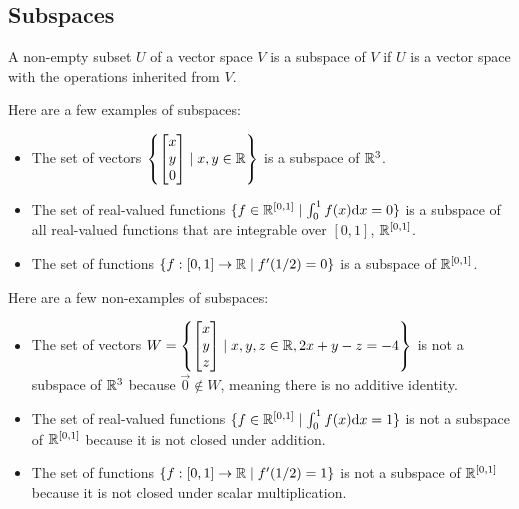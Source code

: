 \subsection{Subspaces}
\begin{definition}
	A non-empty subset $U$ of a vector space $V$ is a subspace of $V$ if $U$ is a vector space with the operations inherited from $V$.
\end{definition}

\begin{example}
	Here are a few examples of subspaces:
	\begin{itemize}
		\item 
			The set of vectors $\left\{\begin{bmatrix}x \\ y \\ 0\end{bmatrix} \mid x,y \in \mathbb{R}\right\}$ is a subspace of $\mathbb{R}^3$.
		\item
			The set of real-valued functions $\{f \in \mathbb{R}^{[0,1]} \mid \int_{0}^{1}{f(x)\mathrm{d} x} = 0\}$ is a subspace of all real-valued functions that are integrable over $[0,1]$, $\mathbb{R}^{[0,1]}$.
		\item
			The set of functions $\{f: [0,1] \to \mathbb{R} \mid f'(1/2) = 0\}$ is a subspace of $\mathbb{R}^{[0,1]}$.
	\end{itemize}
\end{example}

\begin{example}
	Here are a few non-examples of subspaces:
	\begin{itemize}
		\item
			The set of vectors $W = \left\{\begin{bmatrix}x\\y\\z\end{bmatrix} \mid x,y,z \in \mathbb{R}, 2x+y-z=-4\right\}$ is not a subspace of $\mathbb{R}^3$ because $\vec{0} \not\in W$, meaning there is no additive identity.
		\item
			The set of real-valued functions $\{f \in \mathbb{R}^{[0,1]} \mid \int_{0}^{1}{f(x)\mathrm{d} x} = 1\}$ is not a subspace of $\mathbb{R}^{[0,1]}$ because it is not closed under addition.
		\item
			The set of functions $\{f: [0,1] \to \mathbb{R} \mid f'(1/2) = 1\}$ is not a subspace of $\mathbb{R}^{[0,1]}$ because it is not closed under scalar multiplication.
	\end{itemize}
	
\end{example}

